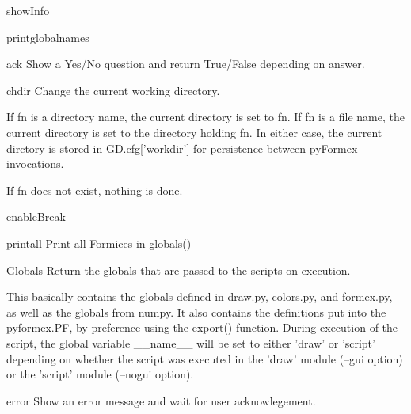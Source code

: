 \begin{funcdesc}{showInfo}{}


\end{funcdesc}


\begin{funcdesc}{printglobalnames}{}


\end{funcdesc}


\begin{funcdesc}{ack}{}
Show a Yes/No question and return True/False depending on answer.

\end{funcdesc}


\begin{funcdesc}{chdir}{}
Change the current working directory.

    If fn is a directory name, the current directory is set to fn.
    If fn is a file name, the current directory is set to the directory
    holding fn.
    In either case, the current dirctory is stored in GD.cfg['workdir']
    for persistence between pyFormex invocations.
    
    If fn does not exist, nothing is done.
    

\end{funcdesc}


\begin{funcdesc}{enableBreak}{}


\end{funcdesc}


\begin{funcdesc}{printall}{}
Print all Formices in globals()

\end{funcdesc}


\begin{funcdesc}{Globals}{}
Return the globals that are passed to the scripts on execution.

    This basically contains the globals defined in draw.py, colors.py,
    and formex.py, as well as the globals from numpy.
    It also contains the definitions put into the pyformex.PF, by
    preference using the export() function.
    During execution of the script, the global variable __name__ will be
    set to either 'draw' or 'script' depending on whether the script
    was executed in the 'draw' module (--gui option) or the 'script'
    module (--nogui option).
    

\end{funcdesc}


\begin{funcdesc}{error}{}
Show an error message and wait for user acknowlegement.

\end{funcdesc}


